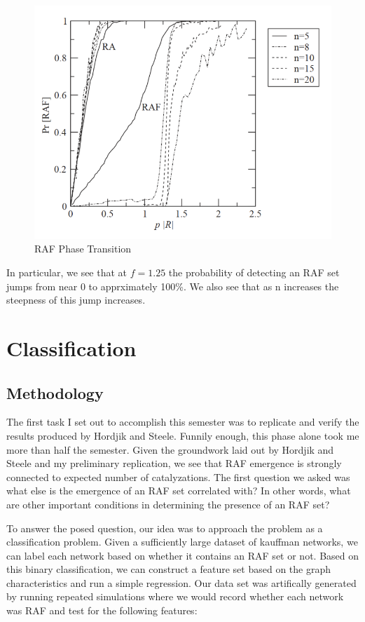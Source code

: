 \documentclass[11pt]{article}
\begin{document}
\begin{figure}[H]
    \centering
    \includegraphics[width=15cm]{hordjik04}
    \caption{RAF Phase Transition}
\end{figure}

In particular, we see that at $f =1.25$ the probability of detecting an RAF set jumps from near 0 to apprximately 100\%. 
We also see that as n increases the steepness of this jump increases. 

\section{Classification}


\subsection*{Methodology}

The first task I set out to accomplish this semester was to replicate and verify the results produced by Hordjik and Steele. Funnily enough, this phase alone took me more than half the semester.
Given the groundwork laid out by Hordjik and Steele and my preliminary replication, we see that RAF emergence is strongly connected to expected number of catalyzations. 
The first question we asked was what else is the emergence of an RAF set correlated with? In other words, what are other important conditions in determining the presence of an RAF set?


To answer the posed question, our idea was to approach the problem as a classification problem. Given a sufficiently large dataset of kauffman networks, we can label each network based on whether it contains an RAF set or not.
Based on this binary classification, we can construct a feature set based on the graph characteristics and run a simple regression. 
Our data set was artifically generated by running repeated simulations where we would record whether each network was RAF and test for the following features:
\end{document}
